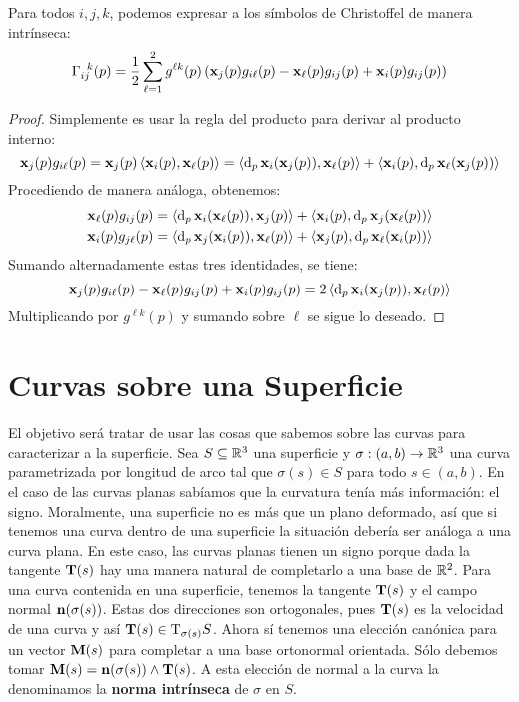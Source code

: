 \begin{prop}
Para todos $i,j,k$, podemos expresar a los símbolos de Christoffel de manera intrínseca: $$\Gamma_{ij}^{\;\;k}(p)=\dfrac{1}{2}\displaystyle\sum_{\ell=1}^2 g^{\ell k}(p)\left(\x_j(p) g_{i\ell}(p)-\x_\ell(p) g_{ij}(p)+\x_i(p) g_{ij}(p)\right)$$
\begin{proof}
Simplemente es usar la regla del producto para derivar al producto interno: $$\x_j(p) g_{i\ell}(p) = \x_j(p)\pint{\x_i(p),\x_\ell(p)} = \pint{\diff_p\x_i(\x_j(p)),\x_\ell(p)}+\pint{\x_i(p),\diff_p\x_\ell(\x_j(p))}$$ Procediendo de manera análoga, obtenemos: \begin{align*}\x_\ell(p) g_{ij}(p)&= \pint{\diff_p\x_i(\x_\ell(p)),\x_j(p)}+\pint{\x_i(p),\diff_p\x_j(\x_\ell(p))} \\ \x_i(p) g_{j\ell}(p)&= \pint{\diff_p\x_j(\x_i(p)),\x_\ell(p)}+\pint{\x_j(p),\diff_p\x_\ell(\x_i(p))}\end{align*} Sumando alternadamente estas tres identidades, se tiene: $$\x_j(p) g_{i\ell}(p)-\x_\ell(p) g_{ij}(p)+\x_i(p) g_{ij}(p) = 2\pint{\diff_p\x_i(\x_j(p)),\x_\ell(p)}$$ Multiplicando por $g^{\ell k}(p)$ y sumando sobre $\ell$ se sigue lo deseado.
\end{proof}
\end{prop}

\section{Curvas sobre una Superficie}

El objetivo será tratar de usar las cosas que sabemos sobre las curvas para caracterizar a la superficie. Sea $S\subseteq\RR^3$ una superficie y $\sigma:(a,b)\to\RR^3$ una curva parametrizada por longitud de arco tal que $\sigma(s)\in S$ para todo $s\in (a,b)$. En el caso de las curvas planas sabíamos que la curvatura tenía más información: el signo. Moralmente, una superficie no es más que un plano deformado, así que si tenemos una curva dentro de una superficie la situación debería ser análoga a una curva plana. En este caso, las curvas planas tienen un signo porque dada la tangente $\T(s)$ hay una manera natural de completarlo a una base de $\RR^2$. Para una curva contenida en una superficie, tenemos la tangente $\T(s)$ y el campo normal $\n(\sigma(s))$. Estas dos direcciones son ortogonales, pues $\T(s)$ es la velocidad de una curva y así $\T(s)\in\mathrm{T}_{\sigma(s)}S$. Ahora sí tenemos una elección canónica para un vector $\M(s)$ para completar a una base ortonormal orientada. Sólo debemos tomar $\M(s)=\n(\sigma(s))\wedge\T(s)$. A esta elección de normal a la curva la denominamos la \textbf{norma intrínseca} de $\sigma$ en $S$.

